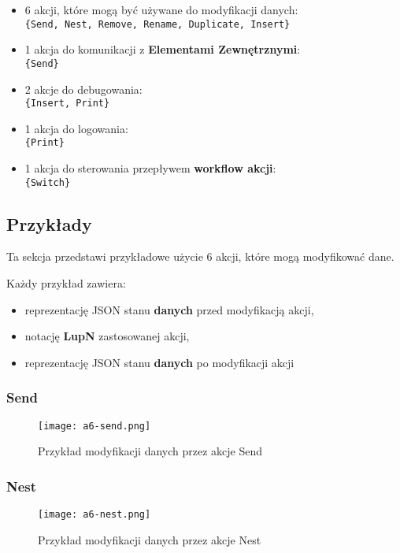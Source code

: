 \begin{itemize}
    \item 6 akcji, które mogą być używane do modyfikacji danych: \\ 
          \texttt{\{Send, Nest, Remove, Rename, Duplicate, Insert\}}
    \item 1 akcja do komunikacji z \textbf{Elementami Zewnętrznymi}: \\ 
          \texttt{\{Send\}}
    \item 2 akcje do debugowania: \\ 
          \texttt{\{Insert, Print\}}
    \item 1 akcja do logowania: \\ 
          \texttt{\{Print\}}
    \item 1 akcja do sterowania przepływem \textbf{workflow akcji}: \\ 
          \texttt{\{Switch\}}
\end{itemize}

\subsection{Przykłady}

Ta sekcja przedstawi przykładowe użycie 6 akcji, które mogą modyfikować dane.

Każdy przykład zawiera:

\begin{itemize}
    \item reprezentację JSON stanu \textbf{danych} przed modyfikacją akcji,
    \item notację \textbf{LupN} zastosowanej akcji,
    \item reprezentację JSON stanu \textbf{danych} po modyfikacji akcji
\end{itemize}

\subsubsection{Send}
\begin{figure}[!h]
    \centering \texttt{[image: a6-send.png]}
    \caption{Przykład modyfikacji danych przez akcje Send}\label{fig:a6-send}
\end{figure}
\subsubsection{Nest}
\begin{figure}[!h]
    \centering \texttt{[image: a6-nest.png]}
    \caption{Przykład modyfikacji danych przez akcje Nest}\label{fig:a6-nest}
\end{figure}
